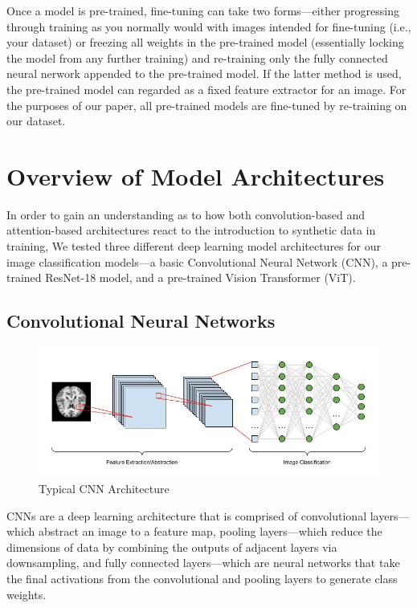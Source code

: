 \documentclass [MAS] {uclathes}
\begin{document}
Once a model is pre-trained, fine-tuning can take two forms---either progressing through training as you normally would
with images intended for fine-tuning (i.e., your dataset) or freezing all weights in the pre-trained model (essentially 
locking the model from any further training) and re-training only the fully connected neural nerwork appended to the 
pre-trained model. If the latter method is used, the pre-trained model can regarded as a fixed feature extractor for an 
image. For the purposes of our paper, all pre-trained models are fine-tuned by re-training on our dataset.

\chapter{Overview of Model Architectures}
In order to gain an understanding as to how both convolution-based and attention-based architectures react to the 
introduction to synthetic data in training, We tested three different deep learning model architectures for our image 
classification models---a basic Convolutional Neural Network (CNN), a pre-trained ResNet-18 model, and a pre-trained 
Vision Transformer (ViT).

\section{Convolutional Neural Networks}

\begin{figure}[h]
    \centering
    \includegraphics[width=0.9\linewidth]{figures/CNN-diagram.jpg}
    \caption{Typical CNN Architecture}
    \label{fig:synthetic-mix}
\end{figure}

CNNs are a deep learning architecture that is comprised of convolutional layers---which abstract an image to a feature 
map, pooling layers---which reduce the dimensions of data by combining the outputs of adjacent layers via downsampling, 
and fully connected layers---which are neural networks that take the final activations from the convolutional and 
pooling layers to generate class weights.
\end{document}

